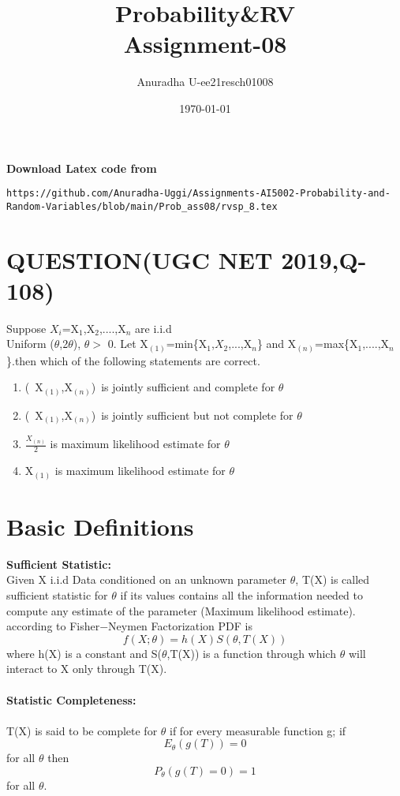 \documentclass[journal,12pt,twocolumn]{IEEEtran}
\title{Probability\&RV \\ Assignment-08}
\author{Anuradha U-ee21resch01008}
\date{\today}
\begin{document}
\maketitle
\newpage
\bigskip
\renewcommand{\thefigure}{\theenumi}
\renewcommand{\thetable}{\theenumi}


\textbf{Download Latex code from}
\begin{lstlisting}
https://github.com/Anuradha-Uggi/Assignments-AI5002-Probability-and-Random-Variables/blob/main/Prob_ass08/rvsp_8.tex
\end{lstlisting}
\section{\textbf{QUESTION(UGC NET 2019,Q-108)}}
Suppose $X_i$=X$_1$,X$_2$,....,X$_n$ are i.i.d \\ Uniform  ($\theta$,2$\theta$),
 $\theta>$ 0. Let X$_{(1)}$=min\{X$_1$,$X_2$,...,X$_n$\} and 
X$_{(n)}$=max\{X$_1$,....,X$_n$\}.then which of the following statements are correct.\\
\begin{enumerate}
    \item (\ X$_{(1)}$,X$_{(n)}$)\ is jointly sufficient and complete for $\theta$
    \item (\ X$_{(1)}$,X$_{(n)}$)\ is jointly sufficient but not complete for
    $\theta$
    \item $\frac{X_{(n)}}{2}$ is maximum likelihood estimate for $\theta$
    \item X$_{(1)}$ is maximum likelihood estimate for $\theta$
    
\end{enumerate}
\section{\textbf{Basic Definitions}}
\textbf{Sufficient Statistic:}\\
Given X i.i.d Data conditioned on an unknown parameter $\theta$, T(X) is called sufficient statistic for $\theta$ if its values contains all the information needed to compute any estimate of the parameter (Maximum likelihood estimate). according to Fisher$-$Neymen Factorization PDF is \\

\begin{equation}
    f(X;\theta)=h(X)S(\theta,T(X))
\end{equation}
where h(X) is a constant and S($\theta$,T(X)) is a function through which $\theta$ will interact to X only through T(X).\\ \\
\textbf{Statistic Completeness:}\\ \\
T(X) is said to be complete for $\theta$ if for every measurable function g;
if 
\begin{equation}
    {E_\theta}(g(T))=0 
\end{equation}
for all $\theta$ then
\begin{equation}
    P_\theta(g(T)=0)=1 
\end{equation}
for all $\theta$.\\
\end{document}
